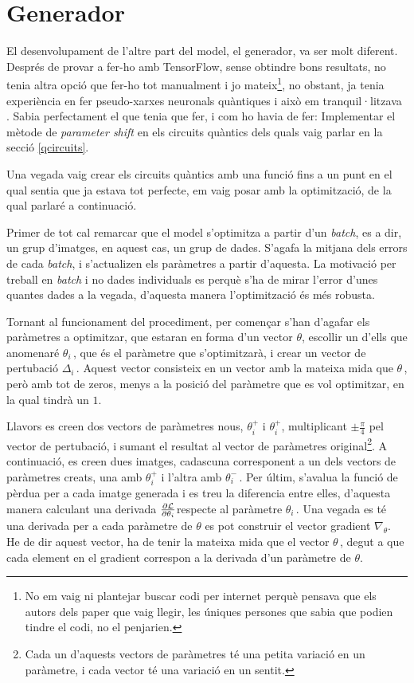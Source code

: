 \section{Generador}

El desenvolupament de l'altre part del model, el generador, va ser molt diferent. Després de provar a fer-ho amb TensorFlow, sense obtindre bons resultats, no tenia altra opció que fer-ho tot manualment i jo mateix\footnote{No em vaig ni plantejar buscar codi per internet perquè pensava que els autors dels paper que vaig llegir, les úniques persones que sabia que podien tindre el codi, no el penjarien.}, no obstant, ja tenia experiència en fer pseudo-xarxes neuronals quàntiques i això em tranquil·litzava . Sabia perfectament el que tenia que fer, i com ho havia de fer: Implementar el mètode de \textit{parameter shift} en els circuits quàntics dels quals vaig parlar en la secció \ref{qcircuits}.

Una vegada vaig crear els circuits quàntics amb una funció fins a un punt en el qual sentia que ja estava tot perfecte, em vaig posar amb la optimització, de la qual parlaré a continuació. 

Primer de tot cal remarcar que el model s'optimitza a partir d'un \textit{batch}, es a dir, un grup d'imatges, en aquest cas, un grup de dades. S'agafa la mitjana dels errors de cada \textit{batch}, i s'actualizen els paràmetres a partir d'aquesta. La motivació per treball en  \textit{batch} i no dades individuals es perquè s'ha de mirar l'error d'unes quantes dades a la vegada, d'aquesta manera l'optimització és més robusta.

Tornant al funcionament del procediment, per començar s'han d'agafar els paràmetres a optimitzar, que estaran en forma d'un vector $\theta$, escollir un d'ells que anomenaré $\theta_{i}\,$, que és el paràmetre que s'optimitzarà, i crear un vector de pertubació $\Delta_{i}\,$. Aquest vector consisteix en un vector amb la mateixa mida que $\theta\,$, però amb tot de zeros, menys a la posició del paràmetre que es vol optimitzar, en la qual tindrà un $1$.

Llavors es creen dos vectors de paràmetres nous, $\theta^{+}_{i}$ i $\theta^{+}_{i}$, multiplicant $\pm\frac{\pi}{4}$ pel vector de pertubació, i sumant el resultat al vector de paràmetres original\footnote{Cada un d'aquests vectors de paràmetres té una petita variació en un paràmetre, i cada vector té una variació en un sentit.}. A continuació, es creen dues imatges, cadascuna corresponent a un dels vectors de paràmetres creats, una amb $\theta^{+}_{i}$ i l'altra amb $\theta^{-}_{i}\,$. Per últim, s'avalua la funció de pèrdua per a cada imatge generada i es treu la diferencia entre elles, d'aquesta manera calculant una derivada $\pdv{\mathcal{L}}{\theta_i}$respecte al paràmetre $\theta_{i}\,$. 
Una vegada es té una derivada per a cada paràmetre de $\theta$ es pot construir el vector gradient $\nabla_\theta$. He de dir aquest vector, ha de tenir la mateixa mida que el vector $\theta\,$, degut a que cada element en el gradient correspon a la derivada d'un paràmetre de $\theta$.

